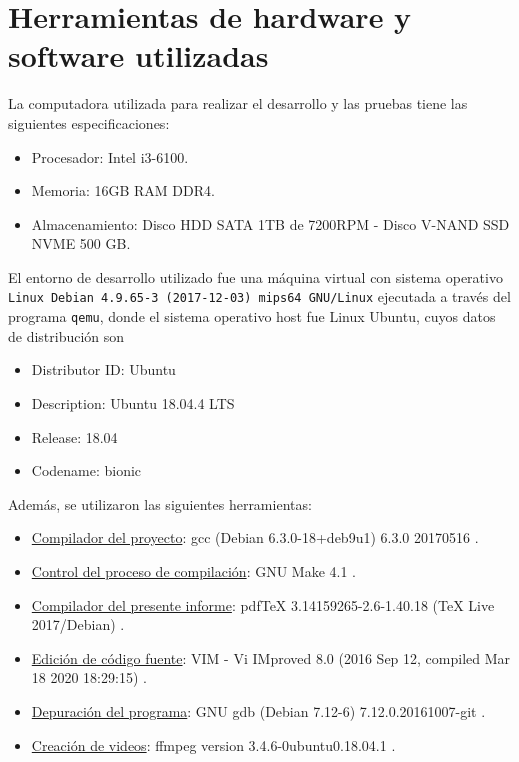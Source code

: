 \documentclass[a4paper,12pt]{article}
\numberwithin{equation}{section}
\numberwithin{figure}{section}
\begin{document}
\section{Herramientas de hardware y software utilizadas}\label{sec_tools}

La computadora utilizada para realizar el desarrollo y las pruebas tiene las siguientes especificaciones:
\begin{itemize}
	\item Procesador: Intel i3-6100.
	\item Memoria: 16GB RAM DDR4.
	\item Almacenamiento: Disco HDD SATA 1TB de 7200RPM - Disco V-NAND SSD NVME 500 GB.
\end{itemize}

El entorno de desarrollo utilizado fue una máquina virtual con sistema operativo \texttt{Linux Debian 4.9.65-3 (2017-12-03) mips64 GNU/Linux} ejecutada a través del programa \texttt{qemu}, donde el sistema operativo host fue Linux Ubuntu, cuyos datos de distribución son
\begin{itemize}
	\item Distributor ID: Ubuntu
	\item Description: Ubuntu 18.04.4 LTS
	\item Release: 18.04
	\item Codename: bionic
\end{itemize}

Además, se utilizaron las siguientes herramientas:
\begin{itemize}
	\item \underline{Compilador del proyecto}: gcc (Debian 6.3.0-18+deb9u1) 6.3.0 20170516 \cite{tool_gcc}.
	\item \underline{Control del proceso de compilación}: GNU Make 4.1 \cite{tool_gnuMake}.
	\item \underline{Compilador del presente informe}: pdfTeX 3.14159265-2.6-1.40.18 (TeX Live 2017/Debian) \cite{tool_latex}.
    \item \underline{Edición de código fuente}: VIM - Vi IMproved 8.0 (2016 Sep 12, compiled Mar 18 2020 18:29:15) \cite{tool_vim}.
	\item \underline{Depuración del programa}: GNU gdb (Debian 7.12-6) 7.12.0.20161007-git \cite{tool_gdb}.
	\item \underline{Creación de videos}: ffmpeg version 3.4.6-0ubuntu0.18.04.1 \cite{tool_ffmpeg}.
\end{itemize}
\end{document}
